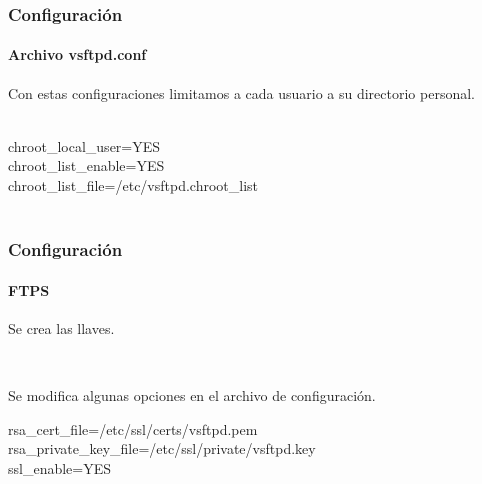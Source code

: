 
    \begin{frame}
    \frametitle{Configuraci\'on}
    \framesubtitle{Archivo vsftpd.conf}
    Con estas configuraciones limitamos a cada usuario a su directorio personal.
    \begin{shell}\\
      chroot\_local\_user=YES\\
      chroot\_list\_enable=YES\\
      chroot\_list\_file=/etc/vsftpd.chroot\_list\\ \\
    \hline\end{shell}
   \end{frame}
   

  \begin{frame}
    \frametitle{Configuraci\'on}
    \framesubtitle{FTPS}
    Se crea las llaves.
    
    \begin{shell}
      \\
    \hline\end{shell}
    
    Se modifica algunas opciones en el archivo de configuraci\'on.
    
    \begin{shell}
      rsa\_cert\_file=/etc/ssl/certs/vsftpd.pem\\
      rsa\_private\_key\_file=/etc/ssl/private/vsftpd.key\\
      ssl\_enable=YES\\
    \hline\end{shell}
   \end{frame}
   
